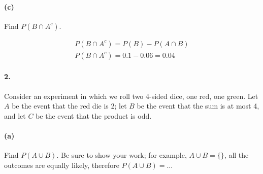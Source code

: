     \paragraph*{(c)}
    Find $P(B \cap A^c)$.

    \begin{mdframed}
        \begin{equation*}
            \begin{gathered}
                P(B \cap A^c) = P(B) - P(A \cap B)  \\
                P(B \cap A^c) = 0.1 - 0.06 = \boxed{0.04}
            \end{gathered}
        \end{equation*}
    \end{mdframed}

    \pagebreak

    \paragraph*{2.}
    Consider an experiment in which we roll two 4-sided dice, one red, one green. Let $A$ be the event that the red die is 2; let $B$ be the event that the sum is at most 4, and let $C$ be the event that the product is odd.

    \paragraph*{(a)}
    Find $P(A \cup B)$. Be sure to show your work; for example, $A \cup B = \{ \}$, all the outcomes are equally likely, therefore $P (A \cup B) = \dots$

